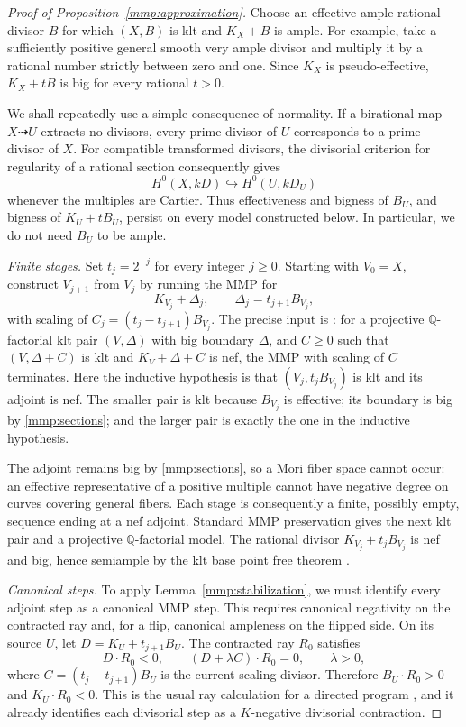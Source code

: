 \begin{proof}[Proof of Proposition~\ref{mmp:approximation}]
Choose an effective ample rational divisor $B$ for which $(X,B)$
is klt and $K_X+B$ is ample.  For example, take a sufficiently
positive general smooth very ample divisor and multiply it by a
rational number strictly between zero and one.  Since $K_X$ is
pseudo-effective, $K_X+tB$ is big for every rational $t>0$.

We shall repeatedly use a simple consequence of normality.  If a
birational map $X\dashrightarrow U$ extracts no divisors, every
prime divisor of $U$ corresponds to a prime divisor of $X$.
For compatible transformed divisors, the divisorial criterion for
regularity of a rational section consequently gives
\begin{equation}\label{mmp:sections}
 H^0(X,kD)\hookrightarrow H^0(U,kD_U)
\end{equation}
whenever the multiples are Cartier.  Thus effectiveness and bigness
of $B_U$, and bigness of $K_U+tB_U$, persist on every model
constructed below.  In particular, we do not need $B_U$ to be ample.

\smallskip\noindent
\emph{Finite stages.}
Set $t_j=2^{-j}$ for every integer $j\geq0$.
Starting with $V_0=X$, construct $V_{j+1}$ from $V_j$ by running
the MMP for
\[
 K_{V_j}+\Delta_j,\qquad
 \Delta_j=t_{j+1}B_{V_j},
\]
with scaling of
$C_j=(t_j-t_{j+1})B_{V_j}$.
The precise input is \cite[Corollary~1.4.2]{BCHM10}:
for a projective $\mathbb Q$-factorial klt pair $(V,\Delta)$
with big boundary $\Delta$, and $C\geq0$ such that
$(V,\Delta+C)$ is klt and $K_V+\Delta+C$ is nef,
the MMP with scaling of $C$ terminates.
Here the inductive hypothesis is that $(V_j,t_jB_{V_j})$ is
klt and its adjoint is nef.  The smaller pair is klt because
$B_{V_j}$ is effective; its boundary is big by
\eqref{mmp:sections}; and the larger pair is exactly the one in
the inductive hypothesis.

The adjoint remains big by \eqref{mmp:sections}, so a Mori fiber
space cannot occur: an effective representative of a positive
multiple cannot have negative degree on curves covering general
fibers.  Each stage is consequently a finite, possibly empty,
sequence ending at a nef adjoint.  Standard MMP preservation gives
the next klt pair and a projective $\mathbb Q$-factorial model.
The rational divisor $K_{V_j}+t_jB_{V_j}$ is nef and big, hence
semiample by the klt base point free theorem
\cite[Theorem~3.3]{KM98}.

\smallskip\noindent
\emph{Canonical steps.}
To apply Lemma~\ref{mmp:stabilization}, we must identify every
adjoint step as a canonical MMP step.  This requires canonical
negativity on the contracted ray and, for a flip, canonical
ampleness on the flipped side.
On its source $U$, let $D=K_U+t_{j+1}B_U$.  The contracted ray
$R_0$ satisfies
\[
 D\cdot R_0<0,\qquad
 (D+\lambda C)\cdot R_0=0,\qquad \lambda>0,
\]
where $C=(t_j-t_{j+1})B_U$ is the current scaling divisor.
Therefore $B_U\cdot R_0>0$ and $K_U\cdot R_0<0$.
This is the usual ray calculation for a directed program
\cite[proof of Corollary~1.3.3]{BCHM10}, and it already identifies
each divisorial step as a $K$-negative divisorial contraction.


\end{proof}
